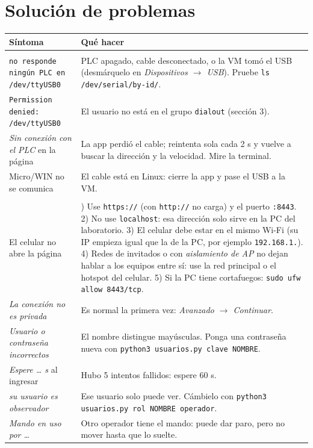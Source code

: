 \documentclass[a4paper,11pt]{article}
\newcommand{\codigo}[1]{\texttt{#1}}
\begin{document}
\section{Solución de problemas}
\begin{center}\small
\begin{longtable}{>{\raggedright}p{5.6cm} >{\raggedright\arraybackslash}p{10.2cm}}
\toprule
\textbf{Síntoma} & \textbf{Qué hacer}\\
\midrule
\endhead
\multicolumn{2}{@{}l}{\textbf{Conexión con el PLC}}\\
\codigo{no responde ningún PLC en /dev/ttyUSB0} & PLC apagado, cable desconectado, o la VM tomó el USB (desmárquelo en \emph{Dispositivos $\rightarrow$ USB}). Pruebe \codigo{ls /dev/serial/by-id/}.\\
\codigo{Permission denied: /dev/ttyUSB0} & El usuario no está en el grupo \codigo{dialout} (sección 3).\\
\emph{Sin conexión con el PLC} en la página & La app perdió el cable; reintenta sola cada 2 s y vuelve a buscar la dirección y la velocidad. Mire la terminal.\\
Micro/WIN no se comunica & El cable está en Linux: cierre la app y pase el USB a la VM.\\
\multicolumn{2}{@{}l}{\textbf{Acceso remoto}}\\
El celular no abre la página & 1) Use \codigo{https://} (con \codigo{http://} no carga) y el puerto \codigo{:8443}. 2) No use \codigo{localhost}: esa dirección solo sirve en la PC del laboratorio. 3) El celular debe estar en el mismo Wi-Fi (su IP empieza igual que la de la PC, por ejemplo \codigo{192.168.1.}). 4) Redes de invitados o con \emph{aislamiento de AP} no dejan hablar a los equipos entre sí: use la red principal o el hotspot del celular. 5) Si la PC tiene cortafuegos: \codigo{sudo ufw allow 8443/tcp}.\\
\emph{La conexión no es privada} & Es normal la primera vez: \emph{Avanzado $\rightarrow$ Continuar}.\\
\emph{Usuario o contraseña incorrectos} & El nombre distingue mayúsculas. Ponga una contraseña nueva con \codigo{python3 usuarios.py clave NOMBRE}.\\
\emph{Espere \dots{} s} al ingresar & Hubo 5 intentos fallidos: espere 60 s.\\
\emph{su usuario es observador} & Ese usuario solo puede ver. Cámbielo con \codigo{python3 usuarios.py rol NOMBRE operador}.\\
\emph{Mando en uso por \dots} & Otro operador tiene el mando: puede dar paro, pero no mover hasta que lo suelte.\\

\end{longtable}
\end{center}
\end{document}
